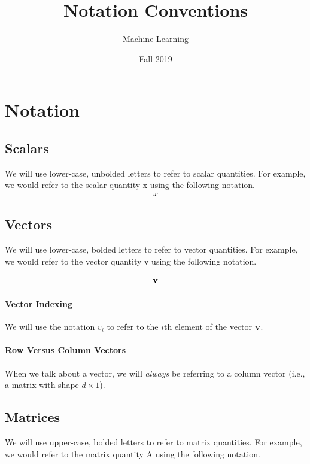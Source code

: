 \documentclass{tufte-handout}
\title{Notation Conventions}
\author{Machine Learning}
\date{Fall 2019}
\begin{document}
\maketitle
\thispagestyle{firstpage}

\section{Notation}

\subsection{Scalars}
We will use lower-case, unbolded letters to refer to scalar quantities.  For example, we would refer to the scalar quantity x using the following notation.
\begin{align}
x
\end{align}

\subsection{Vectors}

We will use lower-case, bolded letters to refer to vector quantities.  For example, we would refer to the vector quantity v using the following notation.

\begin{align}
\mathbf{v}
\end{align}

\paragraph{Vector Indexing}
We will use the notation $v_i$ to refer to the $i$th element of the vector $\mathbf{v}$.

\paragraph{Row Versus Column Vectors}
When we talk about a vector, we will \emph{always} be referring to a column vector (i.e., a matrix with shape $d \times 1$).


\subsection{Matrices}

We will use upper-case, bolded letters to refer to matrix quantities.  For example, we would refer to the matrix quantity A using the following notation.
\end{document}

